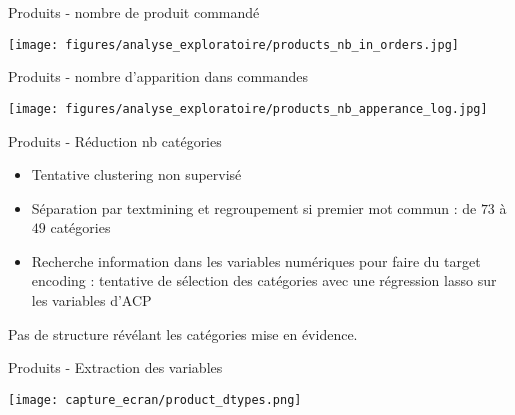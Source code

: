 \documentclass[10pt]{beamer}
\begin{document}
\begin{frame}{Produits - nombre de produit commandé}
\begin{center}
   \texttt{[image: figures/analyse\_exploratoire/products\_nb\_in\_orders.jpg]}
\end{center}
\end{frame}
\begin{frame}{Produits - nombre d'apparition dans commandes}
\begin{center}
   \texttt{[image: figures/analyse\_exploratoire/products\_nb\_apperance\_log.jpg]}
\end{center}
\end{frame}
\begin{frame}{Produits - Réduction nb catégories}
\begin{itemize}
    \item Tentative clustering non supervisé
    \item Séparation par textmining et regroupement si premier mot commun : de $73$ à $49$ catégories
    \item Recherche information dans les variables numériques pour faire du target encoding : tentative de sélection des catégories avec une régression lasso sur les variables d'ACP\\
\end{itemize}

\vspace{0.5cm}
Pas de structure révélant les catégories mise en évidence. 
\end{frame}
\begin{frame}{Produits - Extraction des variables}
\begin{center}
   \texttt{[image: capture\_ecran/product\_dtypes.png]}
\end{center}
\end{frame}
\end{document}

